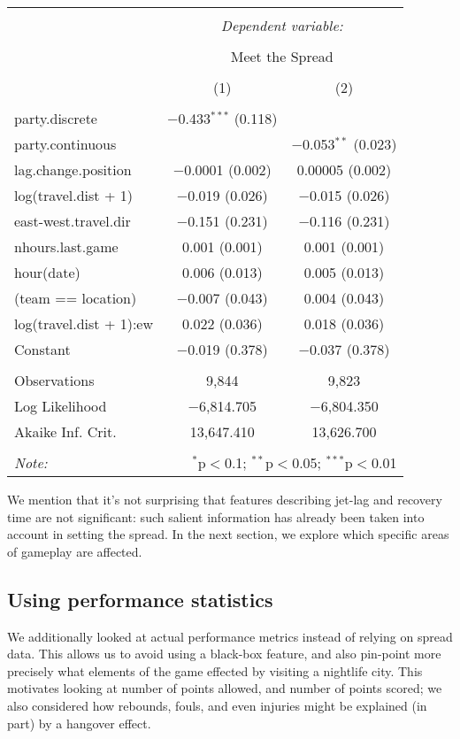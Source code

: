 \documentclass[letterpaper,12pt]{article}
\begin{document}
\begin{tabular}{@{\extracolsep{5pt}}lcc}  \\[-1.8ex]\hline  \hline \\[-1.8ex]   & \multicolumn{2}{c}{\textit{Dependent variable:}} \\  \cline{2-3}  \\[-1.8ex] & \multicolumn{2}{c}{Meet the Spread} \\  \\[-1.8ex] & (1) & (2)\\  \hline \\[-1.8ex]    party.discrete & $-$0.433$^{***}$ (0.118) &  \\    party.continuous &  & $-$0.053$^{**}$ (0.023) \\    lag.change.position & $-$0.0001 (0.002) & 0.00005 (0.002) \\    log(travel.dist + 1) & $-$0.019 (0.026) & $-$0.015 (0.026) \\    east-west.travel.dir & $-$0.151 (0.231) & $-$0.116 (0.231) \\    nhours.last.game & 0.001 (0.001) & 0.001 (0.001) \\    hour(date) & 0.006 (0.013) & 0.005 (0.013) \\    (team == location) & $-$0.007 (0.043) & 0.004 (0.043) \\    log(travel.dist + 1):ew & 0.022 (0.036) & 0.018 (0.036) \\    Constant & $-$0.019 (0.378) & $-$0.037 (0.378) \\   \hline \\[-1.8ex]  Observations & 9,844 & 9,823 \\  Log Likelihood & $-$6,814.705 & $-$6,804.350 \\  Akaike Inf. Crit. & 13,647.410 & 13,626.700 \\  \hline  \hline \\[-1.8ex]  \textit{Note:}  & \multicolumn{2}{r}{$^{*}$p$<$0.1; $^{**}$p$<$0.05; $^{***}$p$<$0.01} \\  \end{tabular} 

We mention that it's not surprising that features describing jet-lag and recovery time
are not significant: such salient information has already been taken into account in
setting the spread.
In the next section, we explore which specific areas of gameplay are affected.

\subsection{Using performance statistics}
We additionally looked at actual performance metrics instead of relying on spread data. 
This allows us to avoid using a black-box feature, and also pin-point
more precisely what elements of the game effected by visiting a nightlife city. This motivates looking at number of points allowed, and number of points scored; we also considered how rebounds, fouls, and even injuries might be 
explained (in part) by a hangover effect.
\end{document}
